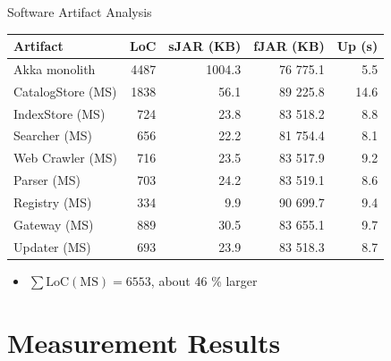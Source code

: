 \documentclass{beamer}
\begin{document}

\begin{frame}{Software Artifact Analysis}

\begin{table}
  \begin{tabular}{l|r|r|r|r}
    \textbf{Artifact} & \textbf{LoC} & \textbf{sJAR (KB)} & \textbf{fJAR (KB)} & \textbf{Up (s)}  \\ \hline
    Akka monolith     & 4487         & 1004.3             & 76 775.1           & 5.5                     \\ \hline
    CatalogStore (MS) & 1838         & 56.1               & 89 225.8           & 14.6                    \\ \hline
    IndexStore (MS)   & 724          & 23.8               & 83 518.2           & 8.8                     \\ \hline
    Searcher (MS)     & 656          & 22.2               & 81 754.4           & 8.1                     \\ \hline
    Web Crawler (MS)  & 716          & 23.5               & 83 517.9           & 9.2                     \\ \hline
    Parser (MS)       & 703          & 24.2               & 83 519.1           & 8.6                     \\ \hline
    Registry (MS)     & 334          & 9.9                & 90 699.7           & 9.4                     \\ \hline
    Gateway (MS)      & 889          & 30.5               & 83 655.1           & 9.7                     \\ \hline
    Updater (MS)      & 693          & 23.9               & 83 518.3           & 8.7                     \\ \hline
  \end{tabular}
\end{table}

\begin{itemize}
  \item $\sum\mbox{LoC}(\mbox{MS}) = 6553$, about 46 \% larger
\end{itemize}

\end{frame}


\section{Measurement Results}
\end{document}
